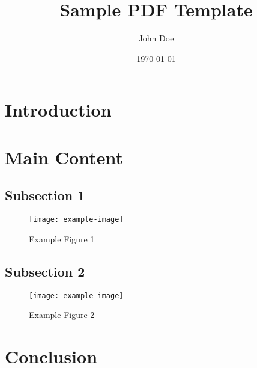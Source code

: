 \documentclass[a4paper,12pt]{article}
\begin{document}
\title{Sample PDF Template}
\author{John Doe}
\date{\today}
\maketitle

\section{Introduction}
\lipsum[1]

\section{Main Content}
\subsection{Subsection 1}
\lipsum[2]

\begin{figure}[h]
    \centering
    \texttt{[image: example-image]}
    \caption{Example Figure 1}
    \label{fig:example1}
\end{figure}

\subsection{Subsection 2}
\lipsum[3]

\begin{figure}[h]
    \centering
    \texttt{[image: example-image]}
    \caption{Example Figure 2}
    \label{fig:example2}
\end{figure}

\section{Conclusion}
\lipsum[4]
\end{document}
